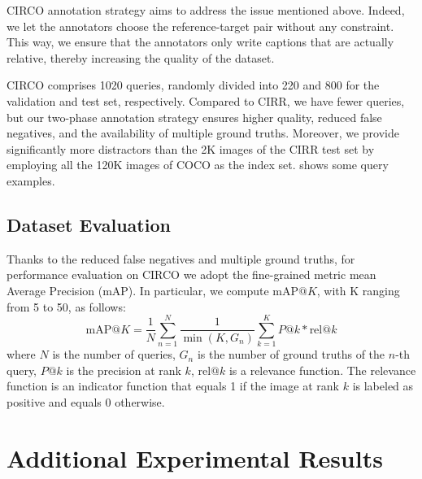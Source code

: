 \documentclass[10pt,twocolumn,letterpaper]{article}
\begin{document}
CIRCO annotation strategy aims to address the issue mentioned above. Indeed, we let the annotators choose the reference-target pair without any constraint. This way, we ensure that the annotators only write captions that are actually relative, thereby increasing the quality of the dataset.

CIRCO comprises 1020 queries, randomly divided into 220 and 800 for the validation and test set, respectively. Compared to CIRR, we have fewer queries, but our two-phase annotation strategy ensures higher quality, reduced false negatives, and the availability of multiple ground truths. Moreover, we provide significantly more distractors than the 2K images of the CIRR test set by employing all the 120K images of COCO as the index set.  shows some query examples.

\subsection{Dataset Evaluation}
Thanks to the reduced false negatives and multiple ground truths, for performance evaluation on CIRCO we adopt the fine-grained metric mean Average Precision (mAP). In particular, we compute mAP$@K$, with K ranging from 5 to 50, as follows:
\begin{equation}
    \text{mAP}@K = \frac{1}{N} \sum\limits^N_{n=1} \frac{1}{\min(K, G_n)} \sum\limits_{k=1}^K P@k * \text{rel}@k
\end{equation}
where $N$ is the number of queries, $G_n$ is the number of ground truths of the $n$-th query, $P@k$ is the precision at rank $k$, rel$@k$ is a relevance function. The relevance function is an indicator function that equals 1 if the image at rank $k$ is labeled as positive and equals 0 otherwise.



 \section{Additional Experimental Results}
\end{document}
